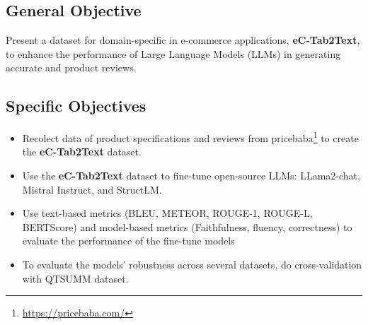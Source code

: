 \subsection{General Objective}
Present a dataset for domain-specific in e-commerce applications, \textbf{eC-Tab2Text}, to enhance the performance of Large Language Models (LLMs) in generating accurate and product reviews.

\subsection{Specific Objectives}
\begin{itemize}
    \item Recolect data of product specifications and reviews from pricebaba\footnote{\url{https://pricebaba.com/}} to create the \textbf{eC-Tab2Text} dataset.
    \item Use the \textbf{eC-Tab2Text} dataset to fine-tune open-source LLMs: LLama2-chat, Mistral Instruct, and StructLM.
    \item Use text-based metrics (BLEU, METEOR, ROUGE-1, ROUGE-L, BERTScore) and model-based metrics (Faithfulness, fluency, correctness) to evaluate the performance of the fine-tune models 
    \item To evaluate the models' robustness across several datasets, do cross-validation with QTSUMM dataset.
\end{itemize}